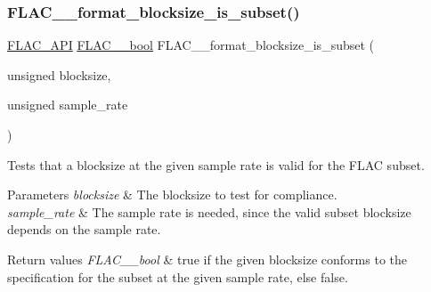 \subsubsection{\texorpdfstring{F\+L\+A\+C\+\_\+\+\_\+format\+\_\+blocksize\+\_\+is\+\_\+subset()}{FLAC\_\_format\_blocksize\_is\_subset()}}
{\footnotesize\ttfamily \hyperlink{group__flac__export_ga56ca07df8a23310707732b1c0007d6f5}{F\+L\+A\+C\+\_\+\+A\+PI} \hyperlink{ordinals_8h_a95103469f1cbd78b8cf250194985b34e}{F\+L\+A\+C\+\_\+\+\_\+bool} F\+L\+A\+C\+\_\+\+\_\+format\+\_\+blocksize\+\_\+is\+\_\+subset (\begin{DoxyParamCaption}\item[{unsigned}]{blocksize,  }\item[{unsigned}]{sample\+\_\+rate }\end{DoxyParamCaption})}

Tests that a blocksize at the given sample rate is valid for the F\+L\+AC subset.


\begin{DoxyParams}{Parameters}
{\em blocksize} & The blocksize to test for compliance. \\
\hline
{\em sample\+\_\+rate} & The sample rate is needed, since the valid subset blocksize depends on the sample rate. \\
\hline
\end{DoxyParams}

\begin{DoxyRetVals}{Return values}
{\em F\+L\+A\+C\+\_\+\+\_\+bool} & {\ttfamily true} if the given blocksize conforms to the specification for the subset at the given sample rate, else {\ttfamily false}. \\
\hline
\end{DoxyRetVals}
\mbox{\label{group__flac__format_gae922cabe2dc3f81af10cb635cf996114}} 
